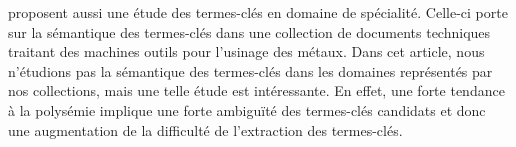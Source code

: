    proposent aussi une étude des
  termes-clés en domaine de spécialité. Celle-ci porte sur la sémantique des
  termes-clés dans une collection de documents techniques traitant des machines
  outils pour l'usinage des métaux. Dans cet article, nous n'étudions pas la
  sémantique des termes-clés dans les domaines représentés par nos collections,
  mais une telle étude est intéressante. En effet, une forte tendance à la
  polysémie implique une forte ambiguïté des termes-clés candidats et donc une
  augmentation de la difficulté de l'extraction des termes-clés.


